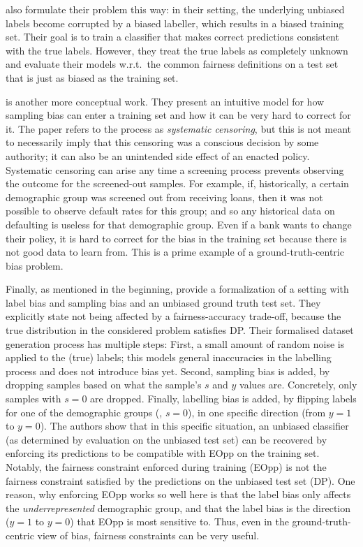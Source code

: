 \citet{jiang2020identifying} also formulate their problem this way:
in their setting, the underlying unbiased labels become corrupted by a biased labeller,
which results in a biased training set.
Their goal is to train a classifier that makes correct predictions consistent with the true labels.
However, they treat the true labels as completely unknown
and evaluate their models w.r.t.\ the common fairness definitions on a test set
that is just as biased as the training set.

\citet{kallus2018residual} is another more conceptual work.
They present an intuitive model for how sampling bias can enter a training set
and how it can be very hard to correct for it.
The paper refers to the process as \emph{systematic censoring},
but this is not meant to necessarily imply that this censoring was a conscious decision by some authority;
it can also be an unintended side effect of an enacted policy.
Systematic censoring can arise any time a screening process prevents observing the outcome for the screened-out samples.
For example, if, historically, a certain demographic group was screened out from receiving loans,
then it was not possible to observe default rates for this group;
and so any historical data on defaulting is useless for that demographic group.
Even if a bank wants to change their policy,
it is hard to correct for the bias in the training set because there is not good data to learn from.
This is a prime example of a ground-truth-centric bias problem.

Finally, as mentioned in the beginning,
\citet{blum2020recovering} provide a formalization of a setting with label bias and sampling bias
and an unbiased ground truth test set.
They explicitly state not being affected by a fairness-accuracy trade-off,
because the true distribution in the considered problem satisfies \acf{DP}.
Their formalised dataset generation process has multiple steps:
First, a small amount of random noise is applied to the (true) labels;
this models general inaccuracies in the labelling process and does not introduce bias yet.
Second, sampling bias is added, by dropping samples based on what the sample's \(s\) and \(y\) values are.
Concretely, only samples with \(s=0\) are dropped.
Finally, labelling bias is added, by flipping labels for one of the demographic groups (\eg, \(s=0\)),
in one specific direction (from \(y=1\) to \(y=0\)).
The authors show that in this specific situation,
an unbiased classifier (as determined by evaluation on the unbiased test set) can be recovered
by enforcing its predictions to be compatible with \acf{EOpp} on the training set.
Notably, the fairness constraint enforced during training (\ac{EOpp})
is not the fairness constraint satisfied by the predictions on the unbiased test set (\ac{DP}).
One reason, why enforcing \ac{EOpp} works so well here is
that the label bias only affects the \emph{underrepresented} demographic group,
and that the label bias is the direction (\(y=1\) to \(y=0\)) that \ac{EOpp} is most sensitive to.
Thus, even in the ground-truth-centric view of bias,
fairness constraints can be very useful.

